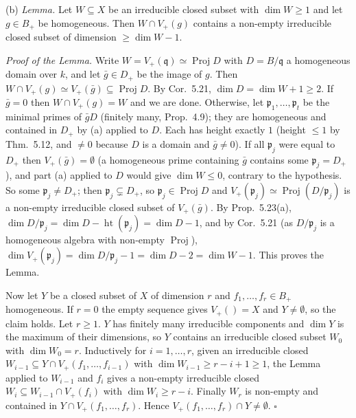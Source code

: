\documentclass[11pt]{article}
\begin{document}
(b) \emph{Lemma.} Let $W\subseteq X$ be an irreducible closed subset with $\dim W\ge1$ and let $g\in B_+$ be homogeneous. Then $W\cap V_+(g)$ contains a non-empty irreducible closed subset of dimension $\ge\dim W-1$.

\emph{Proof of the Lemma.} Write $W=V_+(\mathfrak q)\simeq\operatorname{Proj}D$ with $D=B/\mathfrak q$ a homogeneous domain over $k$, and let $\bar g\in D_+$ be the image of $g$. Then $W\cap V_+(g)\simeq V_+(\bar g)\subseteq\operatorname{Proj}D$. By Cor.~5.21, $\dim D=\dim W+1\ge2$. If $\bar g=0$ then $W\cap V_+(g)=W$ and we are done. Otherwise, let $\mathfrak p_1,\dots,\mathfrak p_t$ be the minimal primes of $\bar gD$ (finitely many, Prop.~4.9); they are homogeneous and contained in $D_+$ by (a) applied to $D$. Each has height exactly $1$ (height $\le1$ by Thm.~5.12, and $\ne0$ because $D$ is a domain and $\bar g\ne0$). If all $\mathfrak p_j$ were equal to $D_+$ then $V_+(\bar g)=\emptyset$ (a homogeneous prime containing $\bar g$ contains some $\mathfrak p_j=D_+$), and part (a) applied to $D$ would give $\dim W\le0$, contrary to the hypothesis. So some $\mathfrak p_j\ne D_+$; then $\mathfrak p_j\subsetneq D_+$, so $\mathfrak p_j\in\operatorname{Proj}D$ and $V_+(\mathfrak p_j)\simeq\operatorname{Proj}(D/\mathfrak p_j)$ is a non-empty irreducible closed subset of $V_+(\bar g)$. By Prop.~5.23(a), $\dim D/\mathfrak p_j=\dim D-\operatorname{ht}(\mathfrak p_j)=\dim D-1$, and by Cor.~5.21 (as $D/\mathfrak p_j$ is a homogeneous algebra with non-empty $\operatorname{Proj}$), $\dim V_+(\mathfrak p_j)=\dim D/\mathfrak p_j-1=\dim D-2=\dim W-1$. This proves the Lemma.

Now let $Y$ be a closed subset of $X$ of dimension $r$ and $f_1,\dots,f_r\in B_+$ homogeneous. If $r=0$ the empty sequence gives $V_+()=X$ and $Y\neq\emptyset$, so the claim holds. Let $r\ge1$. $Y$ has finitely many irreducible components and $\dim Y$ is the maximum of their dimensions, so $Y$ contains an irreducible closed subset $W_0$ with $\dim W_0=r$. Inductively for $i=1,\dots,r$, given an irreducible closed $W_{i-1}\subseteq Y\cap V_+(f_1,\dots,f_{i-1})$ with $\dim W_{i-1}\ge r-i+1\ge1$, the Lemma applied to $W_{i-1}$ and $f_i$ gives a non-empty irreducible closed $W_i\subseteq W_{i-1}\cap V_+(f_i)$ with $\dim W_i\ge r-i$. Finally $W_r$ is non-empty and contained in $Y\cap V_+(f_1,\dots,f_r)$. Hence $V_+(f_1,\dots,f_r)\cap Y\ne\emptyset$. \hfill$\square$
\end{document}
